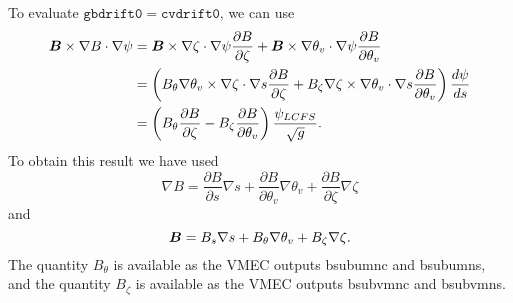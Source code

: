\documentclass[11pt,letter]{article}
\newcommand{\vect}[1]{\mbox{\boldmath $#1$}}
\newcommand{\gbdriftO}{\mathtt{gbdrift0}}
\newcommand{\cvdriftO}{\mathtt{cvdrift0}}
\begin{document}
To evaluate $\gbdriftO = \cvdriftO$, we can use
\begin{align}
\vect{B}\times\nabla B\cdot\nabla\psi 
&= 
\vect{B}\times\nabla \zeta \cdot \nabla \psi \frac{\partial B}{\partial \zeta} + \vect{B}\times\nabla \theta_v \cdot \nabla \psi \frac{\partial B}{\partial \theta_v} \nonumber \\
&=  \left(
B_\theta \nabla\theta_v \times\nabla\zeta\cdot\nabla s \frac{\partial B}{\partial\zeta} + B_\zeta \nabla\zeta\times\nabla\theta_v\cdot\nabla s \frac{\partial B}{\partial\theta_v} \right) \frac{d\psi}{ds} \nonumber \\
&= \left( B_\theta \frac{\partial B}{\partial\zeta} - B_\zeta \frac{\partial B}{\partial\theta_v} \right) \frac{\psi_{LCFS} }{\sqrt{g} }.
\end{align}
To obtain this result we have used
\begin{equation}
\nabla B = \frac{\partial B}{\partial s} \nabla s + \frac{\partial B}{\partial\theta_v} \nabla\theta_v + \frac{\partial B}{\partial\zeta} \nabla\zeta
\label{eq:gradB}
\end{equation}
and
\begin{equation}
\vect{B} = B_s \nabla s + B_\theta \nabla \theta_v + B_\zeta \nabla\zeta.
\label{eq:Bsub}
\end{equation}
The quantity $B_\theta$ is available as the VMEC outputs {\ttfamily bsubumnc} and {\ttfamily bsubumns},
and the quantity $B_\zeta$ is available as the VMEC outputs {\ttfamily bsubvmnc} and {\ttfamily bsubvmns}.
\end{document}
